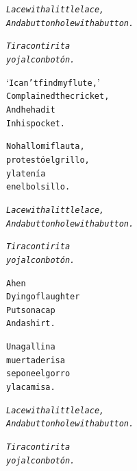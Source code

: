 \documentclass[11pt,a4paper]{article}
\begin{document}
\begin{parcolumns}{2}
\colplacechunks

\colchunk
{
\begin{alltt}\normalfont
\emph{Lace with a little lace,
And a buttonhole with a button.}
\end{alltt}
}

\colchunk
{
\begin{alltt}\normalfont
\emph{Tira con tirita
y ojal con botón.}
\end{alltt}
}

\colplacechunks

\colchunk
{
\begin{alltt}\normalfont
‘I can’t find my flute,’
Complained the cricket,
And he had it
In his pocket.
\end{alltt}
}

\colchunk
{
\begin{alltt}\normalfont
No hallo mi flauta,
protestó el grillo,
y la tenía
en el bolsillo.
\end{alltt}
}

\colplacechunks

\colchunk
{
\begin{alltt}\normalfont
\emph{Lace with a little lace,
And a buttonhole with a button.}
\end{alltt}
}

\colchunk
{
\begin{alltt}\normalfont
\emph{Tira con tirita
y ojal con botón.}
\end{alltt}
}

\colplacechunks

\colchunk
{
\begin{alltt}\normalfont
A hen
Dying of laughter
Puts on a cap
And a shirt.
\end{alltt}
}

\colchunk
{
\begin{alltt}\normalfont
Una gallina
muerta de risa
se pone el gorro
y la camisa.
\end{alltt}
}

\colplacechunks

\colchunk
{
\begin{alltt}\normalfont
\emph{Lace with a little lace,
And a buttonhole with a button.}
\end{alltt}
}

\colchunk
{
\begin{alltt}\normalfont
\emph{Tira con tirita
y ojal con botón.}
\end{alltt}
}

\colplacechunks


\end{parcolumns}
\end{document}
